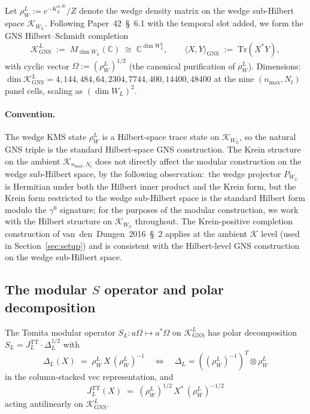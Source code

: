 \documentclass[11pt,a4paper]{article}
\theoremstyle{plain}
\theoremstyle{definition}
\newcommand{\nmax}{n_{\max}}
\newcommand{\Nt}{N_t}
\newcommand{\Krein}{\mathcal{K}}
\newcommand{\C}{\mathbb{C}}
\newcommand{\Tr}{\mathrm{Tr}}
\newcommand{\KL}{K_{L}}
\newcommand{\JL}{J_{L}}
\newcommand{\TT}{\mathrm{TT}}
\newcommand{\GNS}{\mathrm{GNS}}
\begin{document}
Let $\rho_W^L := e^{-\KL^{\alpha, W}}/Z$ denote the wedge density
matrix on the wedge sub-Hilbert space $\Krein_{W_L}$. Following
Paper~42~\S~6.1 with the temporal slot added, we form the GNS
Hilbert--Schmidt completion
\begin{equation}\label{eq:K_GNS_L}
   \Krein_{\GNS}^L
   \;:=\; M_{\dim W_L}(\C)
   \;\cong\; \C^{\dim W_L^2},
   \qquad
   \langle X, Y \rangle_{\GNS} \;:=\; \Tr(X^* Y),
\end{equation}
with cyclic vector $\Omega := (\rho_W^L)^{1/2}$ (the canonical
purification of $\rho_W^L$). Dimensions:\ $\dim \Krein_{\GNS}^L = 4,
144, 484, 64, 2304, 7744, 400, 14400, 48400$ at the nine
$(\nmax, \Nt)$ panel cells, scaling as $(\dim W_L)^2$.

\paragraph{Convention.} The wedge KMS state $\rho_W^L$ is a
Hilbert-space trace state on $\Krein_{W_L}$, so the natural GNS triple
is the standard Hilbert-space GNS construction. The Krein structure
on the ambient $\Krein_{\nmax, \Nt}$ does not directly affect the
modular construction on the wedge sub-Hilbert space, by the
following observation:\ the wedge projector $P_{W_L}$ is Hermitian
under both the Hilbert inner product and the Krein form, but the
Krein form restricted to the wedge sub-Hilbert space is the standard
Hilbert form modulo the $\gamma^0$ signature; for the purposes of the
modular construction, we work with the Hilbert structure on
$\Krein_{W_L}$ throughout. The Krein-positive completion construction
of van~den~Dungen~2016~\S~2 applies at the ambient $\Krein$ level
(used in Section~\ref{sec:setup}) and is consistent with the
Hilbert-level GNS construction on the wedge sub-Hilbert space.

\subsection{The modular $S$ operator and polar decomposition}\label{sec:S_polar_L}

The Tomita modular operator $S_L: a \Omega \mapsto a^* \Omega$ on
$\Krein_{\GNS}^L$ has polar decomposition $S_L = \JL^\TT \cdot
\Delta_L^{1/2}$ with
\begin{equation}\label{eq:Delta_L}
   \Delta_L(X) \;=\; \rho_W^L \, X \, (\rho_W^L)^{-1}
   \quad \Longleftrightarrow\quad
   \Delta_L = ((\rho_W^L)^{-1})^T \otimes \rho_W^L
\end{equation}
in the column-stacked $\mathrm{vec}$ representation, and
\begin{equation}\label{eq:JL_TT}
   \JL^\TT(X)
   \;=\; (\rho_W^L)^{1/2}\, X^*\, (\rho_W^L)^{-1/2}
\end{equation}
acting antilinearly on $\Krein_{\GNS}^L$.
\end{document}
